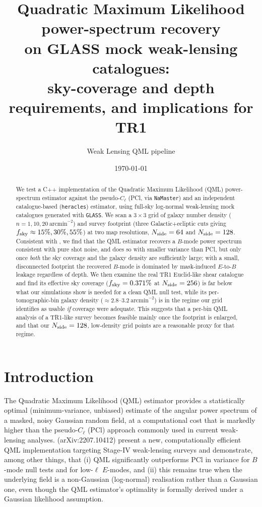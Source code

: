 \documentclass[11pt]{article}
\title{Quadratic Maximum Likelihood power-spectrum recovery\\
on GLASS mock weak-lensing catalogues:\\
sky-coverage and depth requirements, and implications for TR1}
\author{Weak Lensing QML pipeline}
\date{\today}
\begin{document}
\maketitle

\begin{abstract}
We test a C++ implementation of the Quadratic Maximum Likelihood (QML) power-spectrum
estimator against the pseudo-$C_\ell$ (PCl, via \texttt{NaMaster}) and an independent
catalogue-based (\texttt{heracles}) estimator, using full-sky log-normal weak-lensing
mock catalogues generated with \texttt{GLASS}. We scan a $3\times3$ grid of galaxy number
density ($n=1,10,20\ \mathrm{arcmin}^{-2}$) and survey footprint (three Galactic+ecliptic
cuts giving $f_{\rm sky}\approx15\%,30\%,55\%$) at two map resolutions,
$N_{\rm side}=64$ and $N_{\rm side}=128$. Consistent with
\citet{Maraio2022}, we find that the QML estimator recovers a $B$-mode power spectrum
consistent with pure shot noise, and does so with smaller variance than PCl, but only
once \emph{both} the sky coverage and the galaxy density are sufficiently large;
with a small, disconnected footprint the recovered $B$-mode is dominated by
mask-induced $E$-to-$B$ leakage regardless of depth. We then examine the real TR1
Euclid-like shear catalogue and find its effective sky coverage
($f_{\rm sky}=0.371\%$ at $N_{\rm side}=256$) is far below what our simulations show is
needed for a clean QML null test, while its per-tomographic-bin galaxy density
($\approx 2.8$--$3.2\ \mathrm{arcmin}^{-2}$) is in the regime our grid identifies as
usable \emph{if} coverage were adequate. This suggests that a per-bin QML analysis of a
TR1-like survey becomes feasible mainly once the footprint is enlarged, and that our
$N_{\rm side}=128$, low-density grid points are a reasonable proxy for that regime.
\end{abstract}

\tableofcontents

\section{Introduction}

The Quadratic Maximum Likelihood (QML) estimator provides a statistically optimal
(minimum-variance, unbiased) estimate of the angular power spectrum of a masked,
noisy Gaussian random field, at a computational cost that is markedly higher than the
pseudo-$C_\ell$ (PCl) approach commonly used in current weak-lensing analyses.
\citet{Maraio2022} (arXiv:2207.10412) present a new, computationally efficient QML
implementation targeting Stage-IV weak-lensing surveys and demonstrate, among other
things, that (i) QML significantly outperforms PCl in variance for $B$-mode null tests
and for low-$\ell$ $E$-modes, and (ii) this remains true when the underlying field is a
non-Gaussian (log-normal) realisation rather than a Gaussian one, even though the QML
estimator's optimality is formally derived under a Gaussian likelihood assumption.
\end{document}
